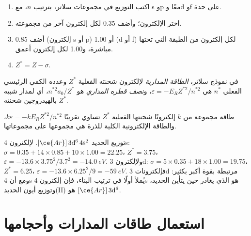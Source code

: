 \begin{method}\label{met:b2:atomic-orbitals:slater}
\begin{enumerate}
  \item اكتب التوزيع في مجموعات سلاتر، بترتيب $n$، مع s وp
        معًا وd وf على حدة.
  \item اختر الإلكترون؛ وأضف 0.35 لكل إلكترون آخر من مجموعته.
  \item أضف 0.85 (إلكترون s أو p) أو 1.00 (d أو f) لكل إلكترون من الطبقة التي
        تحتها مباشرة، و1.00 لكل إلكترون أعمق.
  \item $Z^* = Z - \sigma$.
\end{enumerate}
\end{method}

\begin{definition}\label{def:b2:atomic-orbitals:orbital-energy}
في نموذج سلاتر، \emph{الطاقة المدارية} لإلكترون
شحنته الفعلية $Z^*$ وعدده الكمي الرئيسي الفعلي $n^*$ هي
$\varepsilon = -E_RZ^{*2}/n^{*2}$، و\emph{نصف قطره المداري}
هو $n^{*2}a_0/Z^*$، أي  لمدار شبيه بالهيدروجين شحنته
$Z^*$.
\end{definition}

\begin{proposition}\label{prop:b2:atomic-orbitals:slater-energy}
طاقة مجموعة من $k$ إلكترونًا شحنتها الفعلية $Z^*$ تساوي تقريبًا
$k\varepsilon = -kE_RZ^{*2}/n^{*2}$، والطاقة الإلكترونية الكلية للذرة
هي مجموعها على مجموعاتها.
\end{proposition}

\admitted

\begin{example}\label{ex:b2:atomic-orbitals:iron}
توزيع الحديد $[\ce{Ar}]\,3\mathrm d^6\,4\mathrm s^2$. لإلكترون 4s: $\sigma = 0.35 + 14
\times 0.85 + 10 \times 1.00 = 22.25$، $Z^* = 3.75$، $\varepsilon = -13.6 \times
3.75^2/3.7^2 = \qty{-14.0}{eV}$. ولإلكترون 3d: $\sigma = 5 \times 0.35 + 18 \times 1.00 =
19.75$، $Z^* = 6.25$، $\varepsilon = -13.6 \times 6.25^2/9 = \qty{-59}{eV}$. فإلكترونات
3d مرتبطة بقوة أكبر بكثير: ومع أن 4s يُملأ أولًا في ترتيب
البناء، فإن إلكترون 4s هو الذي يغادر حين يتأين الحديد، وتوزيع
أيون الحديد(II) هو $[\ce{Ar}]\,3\mathrm d^6$.
\end{example}

\section{استعمال طاقات المدارات وأحجامها}

